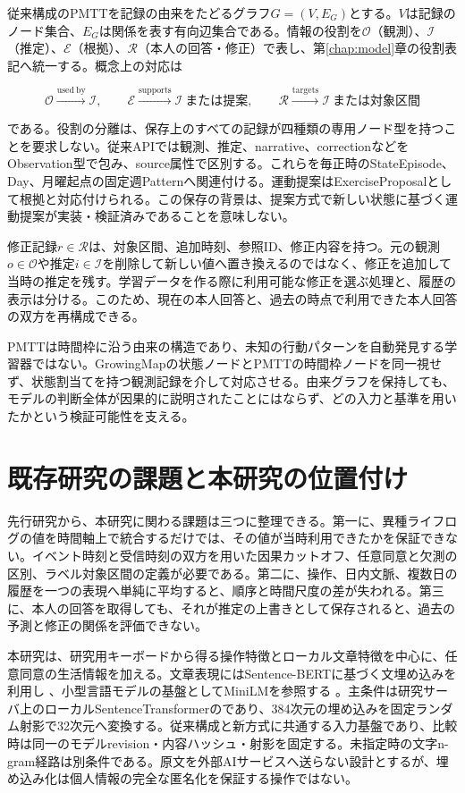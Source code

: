 従来構成のPMTTを記録の由来をたどるグラフ\(G=(V,E_G)\)とする。\(V\)は記録のノード集合、\(E_G\)は関係を表す有向辺集合である。情報の役割を\(\mathcal{O}\)（観測）、\(\mathcal{I}\)（推定）、\(\mathcal{E}\)（根拠）、\(\mathcal{R}\)（本人の回答・修正）で表し、第\ref{chap:model}章の役割表記へ統一する。概念上の対応は

\[
\mathcal{O}\xrightarrow{\mathrm{used\ by}}\mathcal{I},\qquad
\mathcal{E}\xrightarrow{\mathrm{supports}}\mathcal{I}\ \text{または提案},\qquad
\mathcal{R}\xrightarrow{\mathrm{targets}}\mathcal{I}\ \text{または対象区間}
\]

である。役割の分離は、保存上のすべての記録が四種類の専用ノード型を持つことを要求しない。従来APIでは観測、推定、narrative、correctionなどをObservation型で包み、source属性で区別する。これらを毎正時のStateEpisode、Day、月曜起点の固定週Patternへ関連付ける。運動提案はExerciseProposalとして根拠と対応付けられる。この保存の背景は、提案方式で新しい状態に基づく運動提案が実装・検証済みであることを意味しない。

修正記録\(r\in\mathcal R\)は、対象区間、追加時刻、参照ID、修正内容を持つ。元の観測\(o\in\mathcal O\)や推定\(i\in\mathcal I\)を削除して新しい値へ置き換えるのではなく、修正を追加して当時の推定を残す。学習データを作る際に利用可能な修正を選ぶ処理と、履歴の表示は分ける。このため、現在の本人回答と、過去の時点で利用できた本人回答の双方を再構成できる。

PMTTは時間枠に沿う由来の構造であり、未知の行動パターンを自動発見する学習器ではない。GrowingMapの状態ノードとPMTTの時間枠ノードを同一視せず、状態割当てを持つ観測記録を介して対応させる。由来グラフを保持しても、モデルの判断全体が因果的に説明されたことにはならず、どの入力と基準を用いたかという検証可能性を支える。

\section{既存研究の課題と本研究の位置付け}

先行研究から、本研究に関わる課題は三つに整理できる。第一に、異種ライフログの値を時間軸上で統合するだけでは、その値が当時利用できたかを保証できない。イベント時刻と受信時刻の双方を用いた因果カットオフ、任意同意と欠測の区別、ラベル対象区間の定義が必要である。第二に、操作、日内文脈、複数日の履歴を一つの表現へ単純に平均すると、順序と時間尺度の差が失われる。第三に、本人の回答を取得しても、それが推定の上書きとして保存されると、過去の予測と修正の関係を評価できない。

本研究は、研究用キーボードから得る操作特徴とローカル文章特徴を中心に、任意同意の生活情報を加える。文章表現にはSentence-BERTに基づく文埋め込みを利用し \autocite{reimers2019sentencebert}、小型言語モデルの基盤としてMiniLMを参照する \autocite{wang2020minilm}。主条件は研究サーバ上のローカルSentenceTransformerのであり、384次元の埋め込みを固定ランダム射影で32次元へ変換する。従来構成と新方式に共通する入力基盤であり、比較時は同一のモデルrevision・内容ハッシュ・射影を固定する。未指定時の文字n-gram経路は別条件である。原文を外部AIサービスへ送らない設計とするが、埋め込み化は個人情報の完全な匿名化を保証する操作ではない。

